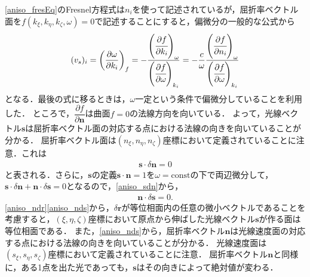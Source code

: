 \eqref{aniso_fresEq}のFresnel方程式は$n_i$を使って記述されているが，屈折率ベクトル面を$f(k_\xi,k_\eta,k_\zeta,\omega)=0$で記述することにすると，偏微分の一般的な公式から
\[
(v_s)_i = \left( \dfrac{\partial\omega}{\partial{}k_i} \right)_f
= -\dfrac{\left(\cfrac{\partial{f}}{\partial{}k_i}\right)_\omega}{\left(\cfrac{\partial{}f}{\partial\omega}\right)_{k_i}}
= -\dfrac{c}{\omega}\dfrac{\left(\cfrac{\partial{f}}{\partial{}n_i}\right)_\omega}{\left(\cfrac{\partial{}f}{\partial\omega}\right)_{k_i}}
\]
となる．最後の式に移るときは，$\omega$一定という条件で偏微分していることを利用した．
ところで，$\dfrac{\partial{f}}{\partial\boldsymbol{n}}$は曲面$f=0$の法線方向を向いている．
よって，光線ベクトル$\boldsymbol{s}$は屈折率ベクトル面の対応する点における法線の向きを向いていることが分かる．
屈折率ベクトル面は$(n_\xi,n_\eta,n_\zeta)$座標において定義されていることに注意．これは
\begin{align}
  \boldsymbol{s}\cdot\delta\boldsymbol{n}=0\label{aniso_sdn}
\end{align}
と表される．さらに，$\boldsymbol{s}$の定義$\boldsymbol{s}\cdot\boldsymbol{n}=1$を$\omega=\text{const}$の下で両辺微分して，
$\boldsymbol{s}\cdot\delta\boldsymbol{n}+\boldsymbol{n}\cdot\delta\boldsymbol{s}=0$となるので，\eqref{aniso_sdn}から，
\begin{align}
  \boldsymbol{n}\cdot\delta\boldsymbol{s}=0.\label{aniso_nds}
\end{align}
\eqref{aniso_ndr}\eqref{aniso_nds}から，$\delta\boldsymbol{r}$が等位相面内の任意の微小ベクトルであることを考慮すると，$(\xi,\eta,\zeta)$座標において原点から伸ばした光線ベクトル$\boldsymbol{s}$が作る面は等位相面である．
また，\eqref{aniso_nds}から，屈折率ベクトル$\boldsymbol{n}$は光線速度面の対応する点における法線の向きを向いていることが分かる．
光線速度面は$(s_\xi,s_\eta,s_\zeta)$座標において定義されていることに注意．
屈折率ベクトル$\boldsymbol{n}$と同様に，ある1点を出た光であっても，$\boldsymbol{s}$はその向きによって絶対値が変わる．

